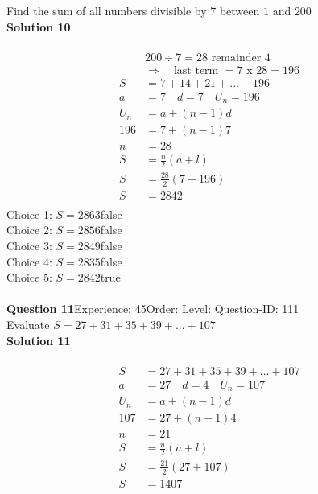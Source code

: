 \documentclass{article}
\begin{document}
Find the sum of all numbers divisible by 7 between $1$ and $200$\\[4pt]
\noindent\textbf{Solution 10}\\[2pt]
\\[-35pt]\begin{align*}
&200 \div 7 = 28 \,\, \text{remainder}\,\, 4\\[2pt]
&\Rightarrow \quad \text{last term }= 7 \,\,\text{x}\,\, 28=196\\[2pt]
S&=7+14+21+...+196\\[12pt]
a&=7\quad d=7 \quad U_n=196\\[2pt]
U_n&=a+(n-1)d\\[2pt]
196&=7+(n-1)7\\[2pt]
n&=28\\[12pt]
S&=\displaystyle\frac{n}{2}(a+l)\\[2pt]
S&=\displaystyle\frac{28}{2}(7+196)\\[2pt]
S&=2842\\[-140pt]
\end{align*}
Choice 1: \hspace{20pt}$S=2863$\hspace{20pt}false\\
Choice 2: \hspace{20pt}$S=2856$\hspace{20pt}false\\
Choice 3: \hspace{20pt}$S=2849$\hspace{20pt}false\\
Choice 4: \hspace{20pt}$S=2835$\hspace{20pt}false\\
Choice 5: \hspace{20pt}$S=2842$\hspace{20pt}true\\
\\[4pt]
\noindent\textbf{Question 11}\hspace{20pt}Experience: 45\hspace{20pt}Order: \hspace{20pt}Level: \hspace{20pt}Question-ID: 111\\[2pt]
Evaluate $S=27+31+35+39+...+107$\\[4pt]
\noindent\textbf{Solution 11}\\[2pt]
\\[-35pt]\begin{align*}
S&=27+31+35+39+...+107\\[2pt]
a&=27\quad d=4 \quad U_n=107\\[2pt]
U_n&=a+(n-1)d\\[2pt]
107&=27+(n-1)4\\[2pt]
n&=21\\[12pt]
S&=\displaystyle\frac{n}{2}(a+l)\\[2pt]
S&=\displaystyle\frac{21}{2}(27+107)\\[2pt]
S&=1407\\[-140pt]
\end{align*}
\end{document}
